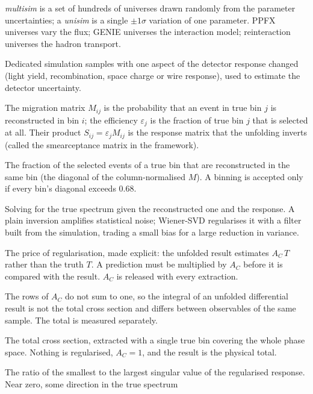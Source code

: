 \begin{description}
    \emph{multisim} is a set of hundreds of universes drawn randomly from the parameter
    uncertainties; a \emph{unisim} is a single $\pm1\sigma$ variation of one parameter. PPFX
    universes vary the flux; GENIE universes the interaction model; reinteraction universes the
    hadron transport.
  \item[Detector variations (detVar)] Dedicated simulation samples with one aspect of the detector
    response changed (light yield, recombination, space charge or wire response), used to estimate
    the detector uncertainty.
  \item[Migration matrix, efficiency, response matrix] The migration matrix $M_{ij}$ is the probability
    that an event in true bin $j$ is reconstructed in bin $i$; the efficiency $\varepsilon_j$ is the
    fraction of true bin $j$ that is selected at all. Their product $S_{ij}=\varepsilon_j M_{ij}$
    is the response matrix that the unfolding inverts (called the smearceptance matrix in the framework).
  \item[Migration diagonal] The fraction of the selected events of a true bin that are
    reconstructed in the same bin (the diagonal of the column-normalised $M$). A binning is accepted
    only if every bin's diagonal exceeds $0.68$.
  \item[Unfolding, Wiener-SVD] Solving for the true spectrum given the reconstructed one and the
    response. A plain inversion amplifies statistical noise; Wiener-SVD regularises it with a filter
    built from the simulation, trading a small bias for a large reduction in variance.
  \item[Additional-smearing matrix $A_C$] The price of regularisation, made explicit: the unfolded
    result estimates $A_C\,T$ rather than the truth $T$. A prediction must be multiplied by $A_C$
    before it is compared with the result. $A_C$ is released with every extraction.
  \item[Not normalisation-preserving] The rows of $A_C$ do not sum to one, so the integral of an
    unfolded differential result is not the total cross section and differs between observables of
    the same sample. The total is measured separately.
  \item[One-bin extraction] The total cross section, extracted with a single true bin covering the
    whole phase space. Nothing is regularised, $A_C=1$, and the result is the physical total.
  \item[Conditioning, $s_{\min}/s_1$, rank-deficient] The ratio of the smallest to the largest
    singular value of the regularised response. Near zero, some direction in the true spectrum

\end{description}
